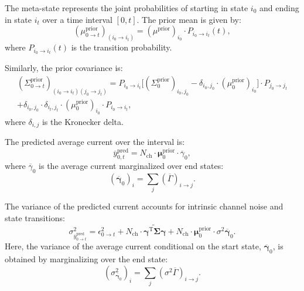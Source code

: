 \documentclass[pdflatex,sn-mathphys-num]{sn-jnl}%
\theoremstyle{thmstyleone}%
\theoremstyle{thmstyletwo}%
\theoremstyle{thmstylethree}%
\begin{document}
The meta-state represents the joint probabilities of starting in state \( i_0 \) and ending in state \( i_t \) over a time interval \( [0, t] \). The prior mean is given by:
\begin{equation}
	(\mu^{\text{prior}}_{0 \rightarrow t})_{(i_0 \rightarrow i_t)} = (\mu^{\text{prior}})_{i_0} \cdot P_{i_0 \rightarrow i_t}(t),
	\label{eq:meta_mean_prior}
\end{equation}
where \( P_{i_0 \rightarrow i_t}(t) \) is the transition probability.

Similarly, the prior covariance is:
\begin{multline}
	(\Sigma^{\text{prior}}_{0 \rightarrow t})_{(i_0 \rightarrow i_t)(j_0 \rightarrow j_t)} = 
	P_{i_0 \rightarrow i_t} \big[(\Sigma^{\text{prior}}_0)_{i_0, j_0} - \delta_{i_0, j_0} \cdot (\mu^{\text{prior}}_0)_{i_0} \big] \cdot P_{j_0 \rightarrow j_t} \\
	+ \delta_{i_0, j_0} \cdot \delta_{i_t, j_t} \cdot (\mu^{\text{prior}}_0)_{i_0} \cdot P_{i_0 \rightarrow i_t},
	\label{eq:meta_covariance_prior}
\end{multline}
where \( \delta_{i, j} \) is the Kronecker delta.

The predicted average current over the interval is:
\begin{equation}
	\overline{y}^{\text{pred}}_{0,t} = N_{\text{ch}} \cdot \mathbf{\mu}^{\text{prior}}_{0} \cdot \overline{\gamma}_{0},
	\label{eq:macro_interval_predicted_y}
\end{equation}
where \( \overline{\gamma}_{0} \) is the average current marginalized over end states:
\begin{equation}
	(\overline{\mathbf{\gamma}}_{0})_i = \sum_j (\overline{\Gamma})_{i \rightarrow j}.
\end{equation}

The variance of the predicted current accounts for intrinsic channel noise and state transitions:
\begin{equation}
	\sigma^2_{\overline{y}^{\text{pred}}_{0 \rightarrow t}} = \epsilon^2_{0 \rightarrow t} + N_{\text{ch}} \cdot \widetilde{\mathbf{\gamma}^{\mathrm{T}} \mathbf{\Sigma}\mathbf{\gamma}} + 
	N_{\text{ch}} \cdot \mathbf{\mu}^{\mathrm{prior}}_{0} \cdot {\sigma^2 \overline{\mathbf{\gamma}}}_{0}.
	\label{eq:macro_interval_sigma_pred}
\end{equation}
Here, the variance of the average current conditional on the start state, \( \overline{\mathbf{\gamma}}_{0} \), is obtained by marginalizing over the end state:
\begin{equation}
	(\sigma^2_{\overline{\mathbf{\gamma}}_{0}})_i = \sum_j (\sigma^2 \overline{\Gamma})_{i \rightarrow j}.
	\label{eq:sigma_gamma_i}
\end{equation}
\end{document}
